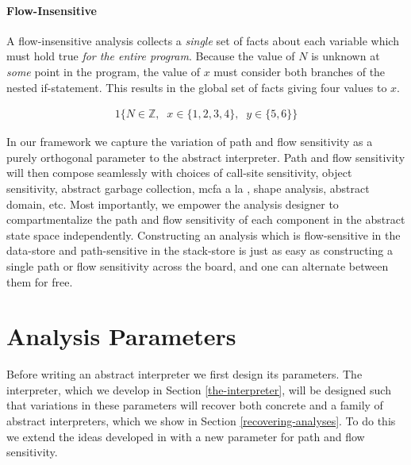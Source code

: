 \par

\paragraph{Flow-Insensitive}

A flow-insensitive analysis collects a \emph{single} set of facts about
each variable which must hold true \emph{for the entire program}.
Because the value of $N$ is unknown at \emph{some} point in the program,
the value of $x$ must consider both branches of the nested if-statement.
This results in the global set of facts giving four values to $x$.

\small\begin{alignat*}{1}
 \{ N \in  \mathbb{Z}  ,\;\;  x \in  \{ 1,2,3,4 \}  ,\;\;  y \in  \{ 5,6 \}  \} 
\end{alignat*}\normalsize

\par

In our framework we capture the variation of path and flow sensitivity
as a purely orthogonal parameter to the abstract interpreter. Path and
flow sensitivity will then compose seamlessly with choices of call-site
sensitivity, object sensitivity, abstract garbage collection, mcfa a la
\citet{dvanhorn:Might2010Resolving}, shape analysis, abstract domain,
etc. Most importantly, we empower the analysis designer to
compartmentalize the path and flow sensitivity of each component in the
abstract state space independently. Constructing an analysis which is
flow-sensitive in the data-store and path-sensitive in the stack-store
is just as easy as constructing a single path or flow sensitivity across
the board, and one can alternate between them for free.

\par

\section{Analysis Parameters}\label{analysis-parameters}

\par

Before writing an abstract interpreter we first design its parameters.
The interpreter, which we develop in Section \ref{the-interpreter}, will
be designed such that variations in these parameters will recover both
concrete and a family of abstract interpreters, which we show in Section
\ref{recovering-analyses}. To do this we extend the ideas developed in
\citet{davdar:van-horn:2010:aam} with a new parameter for path and flow
sensitivity.

